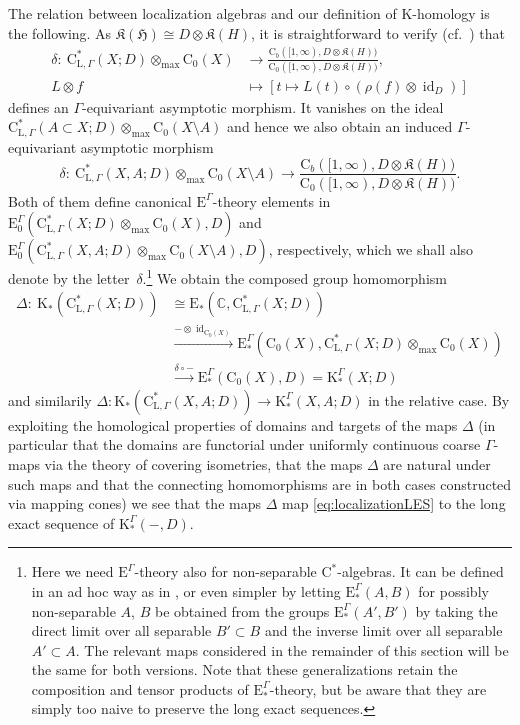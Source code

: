 \documentclass[11pt]{article}
\numberwithin{equation}{section}
\numberwithin{equation}{section}
\theoremstyle{definition}
\newcommand{\C}{\mathbb{C}}
\newcommand{\Ct}{\mathrm{C}}
\newcommand{\Cz}{\Ct_0}
\newcommand{\Cb}{\Ct_b}
\newcommand{\HilbertMod}{\mathfrak{H}}
\DeclareMathOperator{\id}{id}
\newcommand{\maxtensor}{\mathbin{{\otimes}_{\mathrm{max}}}}
\newcommand{\K}{\mathrm{K}}
\newcommand{\EE}{\mathrm{E}}
\newcommand{\textCstar}{\ensuremath{\mathrm{C}^*\!}}
\newcommand{\Loc}{\mathrm{C}^*_{\mathrm{L},\Gamma}}
\newcommand{\Kom}{{\mathfrak{K}}}
\newcommand{\blank}{-}
\begin{document}
The relation between localization algebras and our definition of $\K$-homology is the following. As $\Kom(\HilbertMod)\cong D\otimes\Kom(H)$, it is straightforward to verify (cf.\ \cite[Corollary~4.2]{QiaoRoe}) that
\begin{align*}
\delta\colon\ \Loc(X;D)\maxtensor\Cz(X) &\to\frac{\Cb([1,\infty),D\otimes \Kom(H))}{\Cz([1,\infty),D\otimes\Kom(H))},
\\
L\otimes f&\mapsto [t\mapsto L(t)\circ (\rho(f)\otimes\id_D)]
\end{align*}
defines an $\Gamma$-equivariant asymptotic morphism. It vanishes on the ideal $\Loc(A\subset X;D)\maxtensor\Cz(X\setminus A)$ and hence we also obtain an induced $\Gamma$-equivariant asymptotic morphism
\[
\delta\colon\ \Loc(X,A;D)\maxtensor\Cz(X\setminus A) \to\frac{\Cb([1,\infty),D\otimes \Kom(H))}{\Cz([1,\infty),D\otimes\Kom(H))}.
\]
Both of them define canonical $\EE^\Gamma$-theory elements in $\EE^\Gamma_0(\Loc(X;D)\maxtensor\Cz(X),D)$ and \linebreak $\EE^\Gamma_0(\Loc(X,A;D)\maxtensor\Cz(X\setminus A),D)$, respectively, which we shall also denote by the letter~$\delta$.\footnote{Here we need $\EE^\Gamma$-theory also for non-separable \textCstar-algebras. It can be defined in an ad hoc way as in \cite[Section~1]{WulffTwisted}, or even simpler by letting $\EE^\Gamma_*(A,B)$ for possibly non-separable $A$, $B$ be obtained from the groups $\EE^\Gamma_*(A',B')$ by taking the direct limit over all separable $B'\subset B$ and the inverse limit over all separable $A'\subset A$. The relevant maps considered in the remainder of this section will be the same for both versions.
Note that these generalizations retain the composition and tensor products of $\EE^\Gamma_*$-theory, but be aware that they are simply too naive to preserve the long exact sequences. }
We obtain the composed group homomorphism
\begin{align*}
\Delta\colon\ \K_*(\Loc(X;D))&\cong\EE_*(\C,\Loc(X;D))
\\&\xrightarrow{\blank\otimes\id_{\Cz(X)}}\EE^\Gamma_*(\Cz(X),\Loc(X;D)\maxtensor\Cz(X))
\\&\xrightarrow{\delta\circ\blank}\EE^\Gamma_*(\Cz(X),D)=\K^\Gamma_*(X;D)
\end{align*}
and similarily $\Delta\colon \K_*(\Loc(X,A;D))\to\K^\Gamma_*(X,A;D)$ in the relative case.
By exploiting the homological properties of domains and targets of the maps $\Delta$ (in particular that the domains are functorial under uniformly continuous coarse $\Gamma$-maps via the theory of covering isometries, that the maps $\Delta$ are natural under such maps and that the connecting homomorphisms are in both cases constructed via mapping cones) we see that the maps $\Delta$ map \eqref{eq:localizationLES} to the long exact sequence of $\K^\Gamma_*(\blank,D)$.
\end{document}

